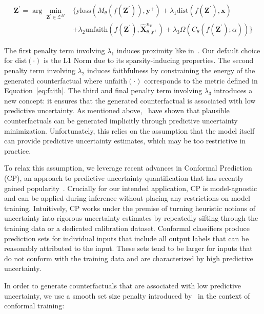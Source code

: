 \documentclass{article}
\begin{document}
\begin{equation} \label{eq:eccco}
  \begin{aligned}
  \mathbf{Z}^\prime= \arg \min_{\mathbf{Z}^\prime \in \mathcal{Z}^M}  &\{  {\text{yloss}(M_{\theta}(f(\mathbf{Z}^\prime)),\mathbf{y}^+)}+ \lambda_{1} {\text{dist}(f(\mathbf{Z}^\prime),\mathbf{x}) } \\
  &+ \lambda_2 \text{unfaith}(f(\mathbf{Z}^\prime),\hat{\mathbf{X}}^{n_E}_{\theta,\mathbf{y}^+}) + \lambda_3 \Omega(C_{\theta}(f(\mathbf{Z}^\prime);\alpha)) \} 
  \end{aligned} 
\end{equation}

The first penalty term involving $\lambda_1$ induces proximity like in~\citet{wachter2017counterfactual}. Our default choice for $\text{dist}(\cdot)$ is the L1 Norm due to its sparsity-inducing properties. The second penalty term involving $\lambda_2$ induces faithfulness by constraining the energy of the generated counterfactual where $\text{unfaith}(\cdot)$ corresponds to the metric defined in Equation~\ref{eq:faith}. The third and final penalty term involving $\lambda_3$ introduces a new concept: it ensures that the generated counterfactual is associated with low predictive uncertainty. As mentioned above,~\citet{schut2021generating} have shown that plausible counterfactuals can be generated implicitly through predictive uncertainty minimization. Unfortunately, this relies on the assumption that the model itself can provide predictive uncertainty estimates, which may be too restrictive in practice. 

To relax this assumption, we leverage recent advances in Conformal Prediction (CP), an approach to predictive uncertainty quantification that has recently gained popularity~\citep{angelopoulos2021gentle,manokhin2022awesome}. Crucially for our intended application, CP is model-agnostic and can be applied during inference without placing any restrictions on model training. Intuitively, CP works under the premise of turning heuristic notions of uncertainty into rigorous uncertainty estimates by repeatedly sifting through the training data or a dedicated calibration dataset. Conformal classifiers produce prediction sets for individual inputs that include all output labels that can be reasonably attributed to the input. These sets tend to be larger for inputs that do not conform with the training data and are characterized by high predictive uncertainty. 

In order to generate counterfactuals that are associated with low predictive uncertainty, we use a smooth set size penalty introduced by~\citet{stutz2022learning} in the context of conformal training:
\end{document}

